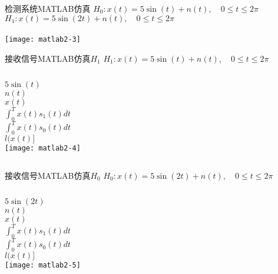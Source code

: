 \begin{frame}{检测系统MATLAB仿真}
$H_0: x(t)=5\sin(t)+n(t),\quad 0 \le t\le 2\pi $\\
$H_1: x(t)=5\sin(2t)+n(t),\quad 0 \le t\le 2\pi $\\
~\\
\texttt{[image: matlab2-3]}
\end{frame}

\begin{frame}[shrink]{接收信号MATLAB仿真$H_1$}
$H_1: x(t)=5\sin(t)+n(t),\quad 0 \le t\le 2\pi $\\
\vspace{0.5cm}
\begin{columns}[T]
	\vspace{0.6cm}
	$5\sin(t)$\\
	\vspace{0.4cm}
	$n(t)$\\
	\vspace{0.4cm}
	$x(t)$\\
	\vspace{0.4cm}
	$\int_{0}^{T}x(t)s_1(t)dt$\\
	\vspace{0.4cm}
	$\int_{0}^{T}x(t)s_0(t)dt$\\
	\vspace{0.4cm}
	$l(x(t)]$\\
	\texttt{[image: matlab2-4]}
\end{columns}
\vspace{0.2cm}
\end{frame}

\begin{frame}[shrink]{接收信号MATLAB仿真$H_0$}
$H_0: x(t)=5\sin(2t)+n(t),\quad 0 \le t\le 2\pi $\\
\vspace{0.5cm}
\begin{columns}[T]
	\vspace{0.6cm}
	$5\sin(2t)$\\
	\vspace{0.4cm}
	$n(t)$\\
	\vspace{0.4cm}
	$x(t)$\\
	\vspace{0.4cm}
	$\int_{0}^{T}x(t)s_1(t)dt$\\
	\vspace{0.4cm}
	$\int_{0}^{T}x(t)s_0(t)dt$\\
	\vspace{0.4cm}
	$l(x(t)]$\\
	\texttt{[image: matlab2-5]}
\end{columns}
\vspace{0.2cm}
\end{frame}

